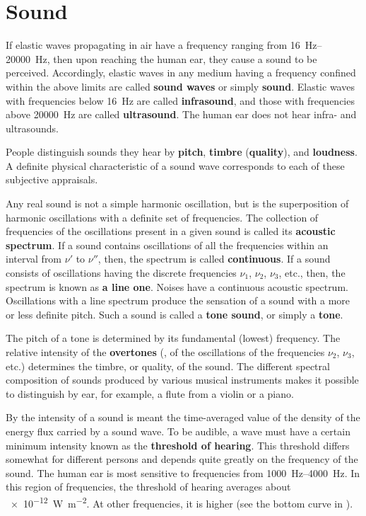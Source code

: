 \section{Sound}\label{sec:14_9}

If elastic waves propagating in air have a frequency ranging from \SIrange{16}{20000}{\hertz}, then upon reaching the human ear, they cause a sound to be perceived.
Accordingly, elastic waves in any medium having a frequency confined within the above limits are called \textbf{sound waves} or simply \textbf{sound}.
Elastic waves with frequencies below \SI{16}{\hertz} are called \textbf{infrasound}, and those with frequencies above \SI{20000}{\hertz} are called \textbf{ultrasound}.
The human ear does not hear infra- and ultrasounds.

People distinguish sounds they hear by \textbf{pitch}, \textbf{timbre} (\textbf{quality}), and \textbf{loudness}.
A definite physical characteristic of a sound wave corresponds to each of these subjective appraisals.

Any real sound is not a simple harmonic oscillation, but is the superposition of harmonic oscillations with a definite set of frequencies.
The collection of frequencies of the oscillations present in a given sound is called its \textbf{acoustic spectrum}.
If a sound contains oscillations of all the frequencies within an interval from $\nu'$ to $\nu''$, then, the spectrum is called \textbf{continuous}.
If a sound consists of oscillations having the discrete frequencies $\nu_1$, $\nu_2$, $\nu_3$, etc., then, the spectrum is known as \textbf{a line one}.
Noises have a continuous acoustic spectrum.
Oscillations with a line spectrum produce the sensation of a sound with a more or less definite pitch.
Such a sound is called a \textbf{tone sound}, or simply a \textbf{tone}.

The pitch of a tone is determined by its fundamental (lowest) frequency.
The relative intensity of the \textbf{overtones} (\ie, of the oscillations of the frequencies $\nu_2$, $\nu_3$, etc.) determines the timbre, or quality, of the sound.
The different spectral composition of sounds produced by various musical instruments makes it possible to distinguish by ear, for example, a flute from a violin or a piano.

By the intensity of a sound is meant the time-averaged value of the density of the energy flux carried by a sound wave.
To be audible, a wave must have a certain minimum intensity known as the \textbf{threshold of hearing}.
This threshold differs somewhat for different persons and depends quite greatly on the frequency of the sound.
The human ear is most sensitive to frequencies from \SIrange{1000}{4000}{\hertz}.
In this region of frequencies, the threshold of hearing averages about \SI{e-12}{\watt\per\metre\squared}.
At other frequencies, it is higher (see the bottom curve in ).

